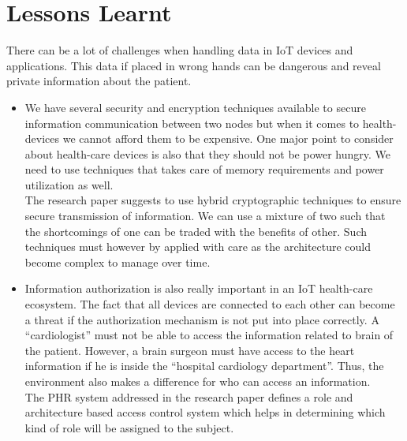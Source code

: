 \documentclass[letterpaper, 10 pt, conference]{ieeeconf}  %
\begin{document}
\section{Lessons Learnt}
There can be a lot of challenges when handling data in IoT devices and applications. This data if placed in wrong hands can be dangerous and reveal private information about the patient.
\begin{itemize}
\item We have several security and encryption techniques available to secure information communication between two nodes but when it comes to health-devices we cannot afford them to be expensive. One major point to consider about health-care devices is also that they should not be power hungry. We need to use techniques that takes care of memory requirements and power utilization as well.\\
The research paper\cite{three} suggests to use hybrid cryptographic techniques to ensure secure transmission of information. We can use a mixture of two such that the shortcomings of one can be traded with the benefits of other. Such techniques must however by applied with care as the architecture could become complex to manage over time.
\item Information authorization is also really important in an IoT health-care ecosystem. The fact that all devices are connected to each other can become a threat if the authorization mechanism is not put into place correctly. A ``cardiologist'' must not be able to access the information related to brain of the patient. However, a brain surgeon must have access to the heart information if he is inside the ``hospital cardiology department''. Thus, the environment also makes a difference for who can access an information.\\
The PHR system addressed in the research paper\cite{phr} defines a role and architecture based access control system which helps in determining which kind of role will be assigned to the subject.
\end{itemize}
\end{document}
